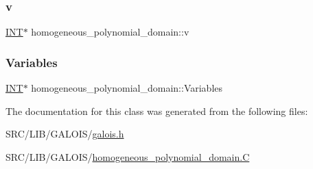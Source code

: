 \subsubsection{\texorpdfstring{v}{v}}
{\footnotesize\ttfamily \mbox{\hyperlink{galois_8h_a09fddde158a3a20bd2dcadb609de11dc}{I\+NT}}$\ast$ homogeneous\+\_\+polynomial\+\_\+domain\+::v}

\mbox{\label{classhomogeneous__polynomial__domain_abcc62c2d05dfa757b0ebf459fdc33b40}} 
\subsubsection{\texorpdfstring{Variables}{Variables}}
{\footnotesize\ttfamily \mbox{\hyperlink{galois_8h_a09fddde158a3a20bd2dcadb609de11dc}{I\+NT}}$\ast$ homogeneous\+\_\+polynomial\+\_\+domain\+::\+Variables}



The documentation for this class was generated from the following files\+:\begin{DoxyCompactItemize}
\item 
S\+R\+C/\+L\+I\+B/\+G\+A\+L\+O\+I\+S/\mbox{\hyperlink{galois_8h}{galois.\+h}}\item 
S\+R\+C/\+L\+I\+B/\+G\+A\+L\+O\+I\+S/\mbox{\hyperlink{homogeneous__polynomial__domain_8_c}{homogeneous\+\_\+polynomial\+\_\+domain.\+C}}\end{DoxyCompactItemize}
